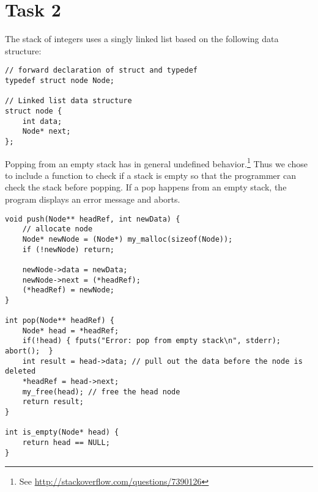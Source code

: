 \section*{Task 2}
The stack of integers uses a singly linked list based on the following data structure:
\begin{lstlisting}
// forward declaration of struct and typedef
typedef struct node Node;

// Linked list data structure
struct node {
    int data;
    Node* next;
};
\end{lstlisting}

Popping from an empty stack has in general undefined behavior.\footnote{See \url{http://stackoverflow.com/questions/7390126}} Thus we chose to include a function to check if a stack is empty so that the programmer can check the stack before popping. If a pop happens from an empty stack, the program displays an error message and aborts.

\begin{lstlisting}
void push(Node** headRef, int newData) {
    // allocate node
    Node* newNode = (Node*) my_malloc(sizeof(Node));
    if (!newNode) return;
            
    newNode->data = newData;
    newNode->next = (*headRef);
    (*headRef) = newNode;
}

int pop(Node** headRef) {
    Node* head = *headRef;
    if(!head) { fputs("Error: pop from empty stack\n", stderr);  abort();  }
    int result = head->data; // pull out the data before the node is deleted
    *headRef = head->next;
    my_free(head); // free the head node
    return result;
}

int is_empty(Node* head) {
    return head == NULL;
}
\end{lstlisting}

